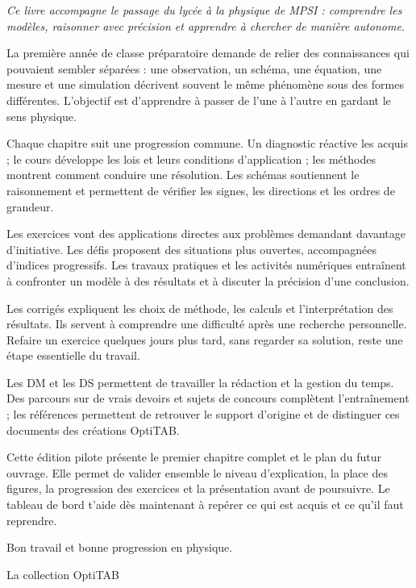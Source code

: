\thispagestyle{mpsiFront}
\begin{minipage}{140mm}
{\fontsize{14}{20}\selectfont\itshape\color{otNavy}
Ce livre accompagne le passage du lycée à la physique de MPSI : comprendre les modèles, raisonner avec précision et apprendre à chercher de manière autonome.\par}
\vspace{4mm}
La première année de classe préparatoire demande de relier des connaissances qui pouvaient sembler séparées : une observation, un schéma, une équation, une mesure et une simulation décrivent souvent le même phénomène sous des formes différentes. L'objectif est d'apprendre à passer de l'une à l'autre en gardant le sens physique.\par
\vspace{2mm}
Chaque chapitre suit une progression commune. Un diagnostic réactive les acquis ; le cours développe les lois et leurs conditions d'application ; les méthodes montrent comment conduire une résolution. Les schémas soutiennent le raisonnement et permettent de vérifier les signes, les directions et les ordres de grandeur.\par
\vspace{2mm}
Les exercices vont des applications directes aux problèmes demandant davantage d'initiative. Les défis proposent des situations plus ouvertes, accompagnées d'indices progressifs. Les travaux pratiques et les activités numériques entraînent à confronter un modèle à des résultats et à discuter la précision d'une conclusion.\par
\vspace{2mm}
Les corrigés expliquent les choix de méthode, les calculs et l'interprétation des résultats. Ils servent à comprendre une difficulté après une recherche personnelle. Refaire un exercice quelques jours plus tard, sans regarder sa solution, reste une étape essentielle du travail.\par
\vspace{2mm}
Les DM et les DS permettent de travailler la rédaction et la gestion du temps. Des parcours sur de vrais devoirs et sujets de concours complètent l'entraînement ; les références permettent de retrouver le support d'origine et de distinguer ces documents des créations OptiTAB.\par
\vspace{2mm}
Cette édition pilote présente le premier chapitre complet et le plan du futur ouvrage. Elle permet de valider ensemble le niveau d'explication, la place des figures, la progression des exercices et la présentation avant de poursuivre. Le tableau de bord t'aide dès maintenant à repérer ce qui est acquis et ce qu'il faut reprendre.\par
\vspace{5mm}
{\sffamily\small\color{otNavy}Bon travail et bonne progression en physique.}\par
\vspace{2mm}
{\sffamily\small\color{otMuted}La collection OptiTAB}
\end{minipage}
